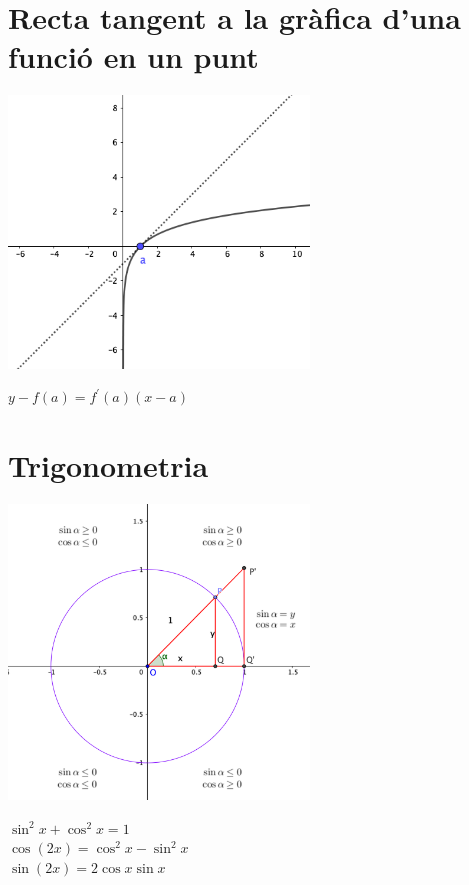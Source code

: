 \documentclass{article}
\begin{document}
\section{Recta tangent a la gràfica d'una funció en un punt}
\begin{minipage}{0.5\textwidth}
	\includegraphics[width=0.6\textwidth]{recta_tangent.png}
\end{minipage}
\begin{minipage}{0.5\textwidth}
	\vspace{0.5 cm}
	$y-f(a)=f^{\prime}(a)(x-a)$\\
	
\end{minipage}

\section{Trigonometria}
\begin{minipage}{0.5\textwidth}
	\includegraphics[width=0.6\textwidth]{circumf_unitat.png}
\end{minipage}
\begin{minipage}{0.5\textwidth}
	\vspace{0.5 cm}
	$\sin^2 x + \cos^2 x=1  $\\ 
	$\cos(2x) =\cos^2 x-\sin^2 x$\\
	$\sin(2x)=2\cos x \sin x$\\
	\end{minipage}
\end{document}
